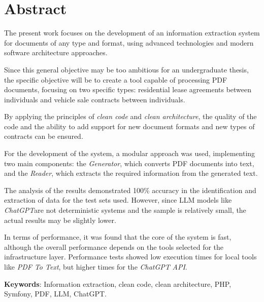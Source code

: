 \newpage
\section*{Abstract}
The present work focuses on the development of an information extraction system for documents of any type and format,
using advanced technologies and modern software architecture approaches.

Since this general objective may be too ambitious for an undergraduate thesis, the specific objective will be to create
a tool capable of processing PDF documents, focusing on two specific types: residential lease agreements between
individuals and vehicle sale contracts between individuals.

By applying the principles of \textit{clean code} and \textit{clean architecture}, the quality of the code and the
ability to add support for new document formats and new types of contracts can be ensured.

For the development of the system, a modular approach was used, implementing two main components: the
\textit{Generator}, which converts PDF documents into text, and the \textit{Reader}, which extracts the required
information from the generated text.

The analysis of the results demonstrated 100\% accuracy in the identification and extraction of data for the test
sets used.
However, since LLM models like \textit{ChatGPT}are not deterministic systems and the sample is relatively small, the
actual results may be slightly lower.

In terms of performance, it was found that the core of the system is fast, although the overall performance depends on
the tools selected for the infrastructure layer.
Performance tests showed low execution times for local tools like \textit{PDF To Text}, but higher times for the
\textit{ChatGPT} \textit{API}.



\vspace{1cm}

\textbf{Keywords}: Information extraction, clean code, clean architecture, PHP, Symfony, PDF, LLM, ChatGPT.

